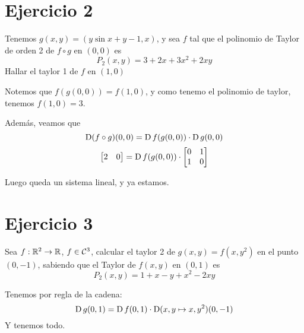\documentclass{article}
\begin{document}
\section*{Ejercicio 2}
Tenemos $g (x,y) = (y \sin x + y - 1, x)$, y sea $f$ tal que el polinomio de Taylor de orden 2 de $f \circ g$ en $(0, 0)$ es
\[P_2(x,y) = 3 + 2x + 3x^2 + 2xy\]
Hallar el taylor 1 de $f$ en $(1,0)$

Notemos que $f (g (0, 0)) = f (1, 0)$, y como tenemo el polinomio de taylor, tenemos $f (1, 0) = 3$.

Además, veamos que
\[\operatorname{D} (f \circ g) (0, 0) = \operatorname{D} f (g (0, 0)) \cdot \operatorname{D} g (0, 0)\]
\[
\begin{bmatrix}
	2 & 0 \\
\end{bmatrix}= \operatorname{D} f (g (0, 0)) \cdot
\begin{bmatrix}
	0 & 1 \\
	1 & 0
\end{bmatrix}
\]

Luego queda un sistema lineal, y ya estamos.

\section*{Ejercicio 3}
Sea $f : \mathbb{R}^2 \to \mathbb{R}$, $f \in \mathcal{C}^3$, calcular el taylor 2 de $g(x,y) = f(x, y^2)$ en el punto $(0, -1)$, sabiendo que el Taylor de $f(x,y)$ en $(0,1)$ es
\[P_2(x,y) = 1 + x - y + x^2 - 2xy\]

Tenemos por regla de la cadena:
\[
	\operatorname{D} g (0, 1) = \operatorname{D} f(0, 1) \cdot \operatorname{D} (x,y \mapsto x, y^2) (0, -1)
\]
Y tenemos todo.
\end{document}
